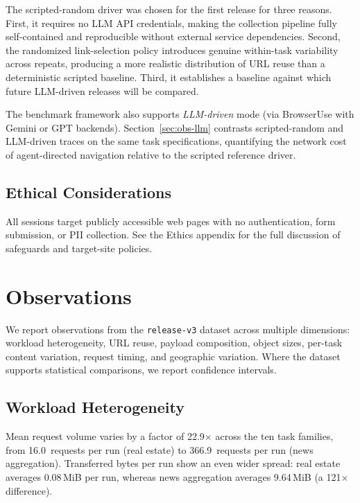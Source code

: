 \documentclass[10pt,sigconf,letterpaper,anonymous,nonacm]{acmart}
\newcommand{\release}{\texttt{release-v3}\xspace}
\begin{document}
The scripted-random driver was chosen for the first release for three
reasons.  First, it requires no LLM API credentials, making the
collection pipeline fully self-contained and reproducible without
external service dependencies.  Second, the randomized link-selection
policy introduces genuine within-task variability across repeats,
producing a more realistic distribution of URL reuse than a
deterministic scripted baseline.  Third, it establishes a baseline
against which future LLM-driven releases will be compared.

The benchmark framework also supports \emph{LLM-driven} mode
(via BrowserUse with Gemini or GPT backends).
Section~\ref{sec:obs-llm} contrasts scripted-random and LLM-driven
traces on the same task specifications, quantifying the network
cost of agent-directed navigation relative to the scripted reference
driver.

\subsection{Ethical Considerations}

All sessions target publicly accessible web pages with no
authentication, form submission, or PII collection.  See the Ethics
appendix for the full discussion of safeguards and target-site
policies.

\section{Observations}
\label{sec:observations}

We report observations from the \release dataset across
multiple dimensions: workload heterogeneity, URL reuse, payload
composition, object sizes, per-task content variation, request
timing, and geographic variation.  Where the dataset supports
statistical comparisons, we report confidence intervals.

\subsection{Workload Heterogeneity}
\label{sec:obs-heterogeneity}

Mean request volume varies by a factor of 22.9$\times$ across the ten
task families, from 16.0~requests per run (real estate) to
366.9~requests per run (news aggregation).  Transferred bytes per run
show an even wider spread: real estate averages 0.08\,MiB per
run, whereas news aggregation averages 9.64\,MiB (a 121$\times$
difference).
\end{document}
